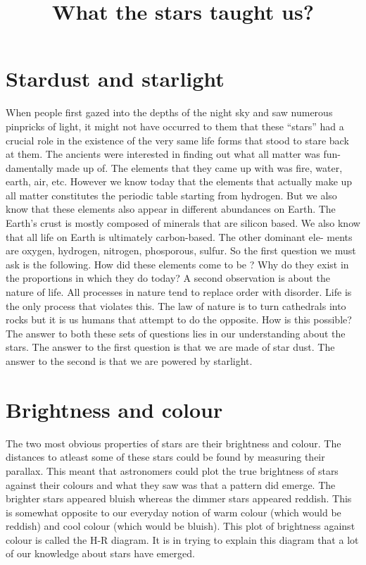 \documentclass{../template/texnote}
\title{\textbf{What the stars taught us?}}[author={Linn Abraham}]
\begin{document}
    \maketitle {}

\section{Stardust and starlight}
When people first gazed into the depths of the night sky and saw numerous
pinpricks of light, it might not have occurred to them that these “stars” had a
crucial role in the existence of the very same life forms that stood to stare back
at them. The ancients were interested in finding out what all matter was fun-
damentally made up of. The elements that they came up with was fire, water,
earth, air, etc. However we know today that the elements that actually make
up all matter constitutes the periodic table starting from hydrogen. But we also
know that these elements also appear in different abundances on Earth. The
Earth’s crust is mostly composed of minerals that are silicon based. We also
know that all life on Earth is ultimately carbon-based. The other dominant ele-
ments are oxygen, hydrogen, nitrogen, phosporous, sulfur. So the first question
we must ask is the following. How did these elements come to be ? Why do
they exist in the proportions in which they do today?
A second observation is about the nature of life. All processes in nature tend
to replace order with disorder. Life is the only process that violates this. The
law of nature is to turn cathedrals into rocks but it is us humans that attempt
to do the opposite. How is this possible? The answer to both these sets of
questions lies in our understanding about the stars. The answer to the first
question is that we are made of star dust. The answer to the second is that we
are powered by starlight.

\section{Brightness and colour}
The two most obvious properties of stars are their brightness and colour.
The distances to atleast some of these stars could be found by measuring their parallax.
This meant that astronomers could plot the true brightness of stars against their colours and what they saw was that a pattern did emerge.
The brighter stars appeared bluish whereas the dimmer stars appeared reddish.
This is somewhat opposite to our everyday notion of warm colour (which would be reddish) and cool colour (which would be bluish).
This plot of brightness against colour is called the H-R diagram.
It is in trying to explain this diagram that a lot of our knowledge about stars have emerged.
\end{document}
